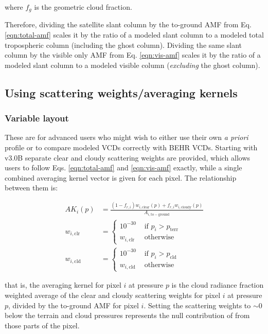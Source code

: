\documentclass[12pt]{article}
\begin{document}
	where $f_g$ is the geometric cloud fraction. 
	
	Therefore, dividing the satellite slant column by the to-ground AMF from Eq. \eqref{eqn:total-amf} scales it by the ratio of a modeled slant column to a modeled total tropospheric column (including the ghost column). Dividing the same slant column by the visible only AMF from Eq. \eqref{eqn:vis-amf} scales it by the ratio of a modeled slant column to a modeled visible column (\emph{excluding} the ghost column).

	
	\subsection{Using scattering weights/averaging kernels} \label{sec:scweights}
	\subsubsection{Variable layout}
	These are for advanced users who might wish to either use their own \emph{a priori}  profile or to compare modeled  VCDs correctly with BEHR VCDs.  Starting with v3.0B separate clear and cloudy scattering weights are provided, which allows users to follow Eqs. \eqref{eqn:total-amf} and \eqref{eqn:vis-amf} exactly, while a single combined averaging kernel vector is given for each pixel. The relationship between them is:
	
	\begin{align}
	AK_i(p) &= \frac{(1-f_{r,i})w_{i,\mathrm{clear}}(p) + f_{r,i} w_{i,\mathrm{cloudy}}(p)}{A_{i,\mathrm{to-ground}}} \\
	w_{i, \mathrm{clr}} &= \left\lbrace 
		\begin{matrix}
			10^{-30} & \text{ if } p_i > p_\mathrm{terr} \\
			w_{i, \mathrm{clr}} & \text{ otherwise }
		\end{matrix}\right. \\
	w_{i, \mathrm{cld}} &= \left\lbrace 
		\begin{matrix} 
			10^{-30} & \text{ if } p_i > p_\mathrm{cld} \\
			w_{i, \mathrm{cld}} & \text{ otherwise }
		\end{matrix}\right. \label{eqn-cldSW}
	\end{align}
	
that is, the averaging kernel for pixel $i$ at pressure $p$ is the cloud radiance fraction weighted average of the clear and cloudy scattering weights for pixel $i$ at pressure $p$, divided by the to-ground AMF for pixel $i$. Setting the scattering weights to $\sim 0$ below the terrain and cloud pressures represents the null contribution of  from those parts of the pixel.
	
\end{document}

